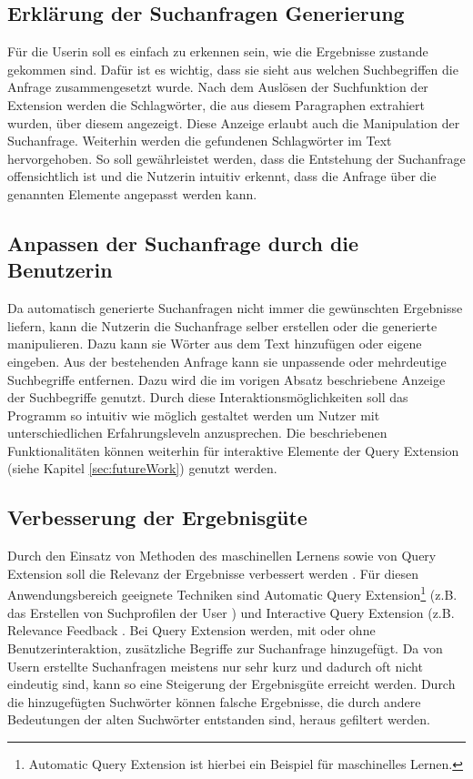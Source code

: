  \subsection{Erklärung der Suchanfragen Generierung}
 \label{ssec:suchanfragenGenerierung}
 Für die Userin soll es einfach zu erkennen sein, wie die Ergebnisse zustande gekommen sind. Dafür ist es wichtig, dass sie sieht aus welchen Suchbegriffen die Anfrage zusammengesetzt wurde. Nach dem Auslösen der Suchfunktion der Extension werden die Schlagwörter, die aus diesem Paragraphen extrahiert wurden, über diesem angezeigt. Diese Anzeige erlaubt auch die Manipulation der Suchanfrage. Weiterhin werden die gefundenen Schlagwörter im Text hervorgehoben. So soll gewährleistet werden, dass die Entstehung der Suchanfrage offensichtlich ist und die Nutzerin intuitiv erkennt, dass die Anfrage über die genannten Elemente angepasst werden kann.

 \subsection{Anpassen der Suchanfrage durch die Benutzerin}
 Da automatisch generierte Suchanfragen nicht immer die gewünschten Ergebnisse liefern, kann die Nutzerin die Suchanfrage selber erstellen oder die generierte manipulieren. Dazu kann sie Wörter aus dem Text hinzufügen oder eigene eingeben. Aus der bestehenden Anfrage kann sie unpassende oder mehrdeutige Suchbegriffe entfernen. Dazu wird die im vorigen Absatz beschriebene Anzeige der Suchbegriffe genutzt. Durch diese Interaktionsmöglichkeiten soll das Programm so intuitiv wie möglich gestaltet werden um Nutzer mit unterschiedlichen Erfahrungsleveln anzusprechen. Die beschriebenen Funktionalitäten können weiterhin für interaktive Elemente der Query Extension (siehe Kapitel \ref{sec:futureWork}) genutzt werden.

 \subsection{Verbesserung der Ergebnisgüte}
 Durch den Einsatz von Methoden des maschinellen Lernens sowie von Query Extension soll die Relevanz der Ergebnisse verbessert werden \cite{ruthven2003re}. Für diesen Anwendungsbereich geeignete Techniken sind Automatic Query Extension\footnote{Automatic Query Extension ist hierbei ein Beispiel für maschinelles Lernen.} (z.B. das Erstellen von Suchprofilen der User \cite{budzik2000user}) und Interactive Query Extension (z.B. Relevance Feedback \cite{harman1988towards}. Bei Query Extension werden, mit oder ohne Benutzerinteraktion, zusätzliche Begriffe zur Suchanfrage hinzugefügt. Da von Usern erstellte Suchanfragen meistens nur sehr kurz \cite{ruthven2003re} und dadurch oft nicht eindeutig sind, kann so eine Steigerung der Ergebnisgüte erreicht werden. Durch die hinzugefügten Suchwörter können falsche Ergebnisse, die durch andere Bedeutungen der alten Suchwörter entstanden sind, heraus gefiltert werden.

